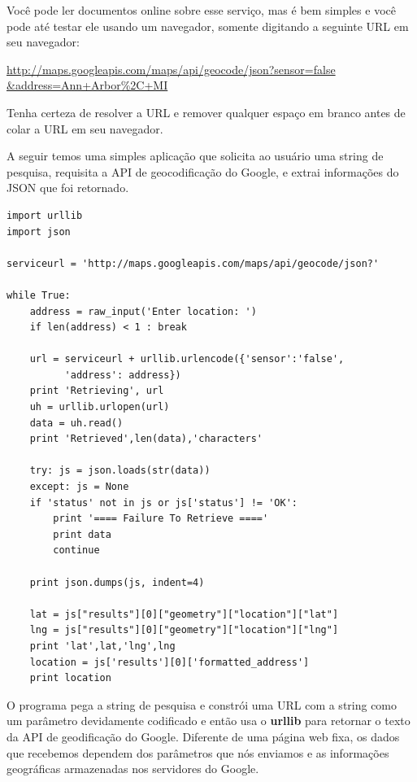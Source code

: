 Você pode ler documentos online sobre esse serviço, mas é bem simples e você
pode até testar ele usando um navegador, somente digitando a seguinte URL em
seu navegador:

\url{http://maps.googleapis.com/maps/api/geocode/json?sensor=false &address=Ann+Arbor%2C+MI}

Tenha certeza de resolver a URL e remover qualquer espaço em branco antes de 
colar a URL em seu navegador.

A seguir temos uma simples aplicação que solicita ao usuário uma string de
pesquisa, requisita a API de geocodificação do Google, e extrai informações do
JSON que foi retornado.

\beforeverb
\begin{verbatim}
import urllib
import json

serviceurl = 'http://maps.googleapis.com/maps/api/geocode/json?'

while True:
    address = raw_input('Enter location: ')
    if len(address) < 1 : break

    url = serviceurl + urllib.urlencode({'sensor':'false', 
          'address': address})
    print 'Retrieving', url
    uh = urllib.urlopen(url)
    data = uh.read()
    print 'Retrieved',len(data),'characters'

    try: js = json.loads(str(data))
    except: js = None
    if 'status' not in js or js['status'] != 'OK':
        print '==== Failure To Retrieve ===='
        print data
        continue

    print json.dumps(js, indent=4)

    lat = js["results"][0]["geometry"]["location"]["lat"]
    lng = js["results"][0]["geometry"]["location"]["lng"]
    print 'lat',lat,'lng',lng
    location = js['results'][0]['formatted_address']
    print location
\end{verbatim}
\afterverb

O programa pega a string de pesquisa e constrói uma URL com a string
como um parâmetro devidamente codificado e então usa o {\bf urllib}
para retornar o texto da API de geodificação do Google. Diferente
de uma página web fixa, os dados que recebemos dependem dos parâmetros 
que nós enviamos e as informações geográficas armazenadas nos 
servidores do Google.

